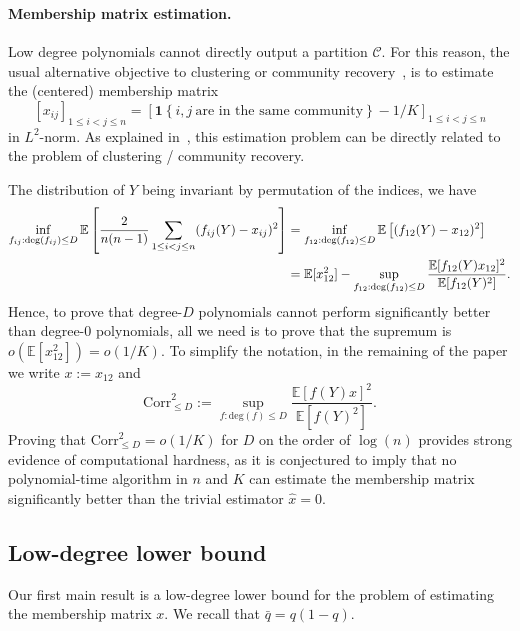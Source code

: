 \documentclass[final]{colt2026}
\newcommand{\1}{\mathbf{1}}
\newcommand{\ac}[1]{\left\{#1\right\}}
\newcommand{\cro}[1]{\left[#1\right]}
\begin{document}
\paragraph{Membership matrix estimation.}
Low degree polynomials cannot directly output a partition $\hat{\mathcal{C}}$. For this reason, the usual alternative objective  
to clustering or community recovery~\cite{luo2023computational,Even24,SohnWein25,pmlr-v291-chin25a,Even25a}, is to estimate the (centered) membership matrix
$$[x_{ij}]_{1\leq i<j \leq n}=[\mathbf{1}\ac{i,j\ \text{are in the same community}}-1/K]_{1\leq i<j \leq n}$$
in $L^2$-norm. As explained in~\cite{Even24,Even25a}, this estimation problem can be directly related to the problem of clustering / community recovery.  

The distribution of $Y$ being invariant by permutation of the indices, we have
\begin{align*}
\inf_{f_{ij}: \mathrm{deg}(f_{ij})\leq D} \mathbb{E}\cro{{2\over n(n-1)}\sum_{1\leq i < j\leq n}(f_{ij}(Y)-x_{ij})^2}&=\inf_{f_{12}: \mathrm{deg}(f_{12})\leq D} \mathbb{E}\cro{(f_{12}(Y)-x_{12})^2}\\
&= \mathbb{E}[x_{12}^2]- \sup_{f_{12}: \mathrm{deg}(f_{12})\leq D}\frac{\mathbb{E}[f_{12}(Y)x_{12}]^2}{\mathbb{E}[f_{12}(Y)^2]}.
\end{align*}
Hence, to prove that degree-$D$ polynomials cannot perform significantly better than degree-0 polynomials, all we need is to prove that the supremum is $o(\mathbb{E}[x_{12}^2])=o(1/K)$. To simplify the notation, in the remaining of the paper we write $x:=x_{12}$ and 
\begin{equation}\label{eq:corr:def}
\mathrm{Corr}_{\leq D}^2 := \sup_{f: \mathrm{deg}(f)\leq D}\frac{\mathbb{E}[f(Y)x]^2}{{\mathbb{E}[f(Y)^2]}}.
\end{equation}
Proving that $\mathrm{Corr}_{\leq D}^2=o(1/K)$  for $D$ on the order of $\log(n)$ provides strong evidence of computational hardness, as it is conjectured to imply that no polynomial-time algorithm in $n$ and $K$ can estimate the membership matrix significantly better than the trivial estimator $\hat x=0$.





\subsection{Low-degree lower bound}\label{sec:LD-lower-bound}

Our first main result is a low-degree lower bound for the problem of estimating the membership matrix $x$.
We recall that $\bar q=q(1-q)$.
\end{document}
